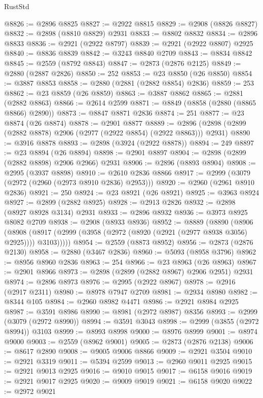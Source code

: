 \begin{lexlean}{RustStd}
\begin{coremodule}
@8826 := @2896 @8825
@8827 := @2922 @8815
@8829 := @2908 (@8826 @8827)
@8832 := @2898 (@8810 @8829) @2931
@8833 := @8802 @8832
@8834 := @2896 @8833
@8836 := @2921 (@2922 @8797)
@8839 := @2921 (@2922 @8807) @2925
@8840 := @8836 @8839
@8842 := @3243 @8840 @2709
@8843 := @8834 @8842
@8845 := @2559 (@8792 @8843)
@8847 := @2873 (@2876 @2125)
@8849 := @2880 (@2887 @2826)
@8850 := 252
@8853 := @23 @8850 (@26 @8850)
@8854 := @3887 @8853
@8858 := @2880 (@2881 (@2882 @8854) @2836)
@8859 := 253
@8862 := @23 @8859 (@26 @8859)
@8863 := @3887 @8862
@8865 := @2881 (@2882 @8863)
@8866 := @2614 @2599
@8871 := @8849 (@8858 (@2880 (@8865 @8866) @2890))
@8873 := @8847 @8871 @2836
@8874 := 251
@8877 := @23 @8874 (@26 @8874)
@8878 := @2901 @8877
@8889 := @2896 (@2898 (@2899 (@2882 @8878) @2906 (@2977 (@2922 @8854) (@2922 @8863))) @2931)
@8890 := @3916 @8878
@8893 := @2898 (@3924 (@2922 @8878))
@8894 := 249
@8897 := @23 @8894 (@26 @8894)
@8898 := @2901 @8897
@8904 := @2898 (@2899 (@2882 @8898) @2906 @2966) @2931
@8906 := @2896 (@8893 @8904)
@8908 := @2995 (@3937 @8898)
@8910 := @2610 @2836 @8866
@8917 := @2999 (@3079 (@2972 (@2960 (@2973 @8910 @2836) @2953)))
@8920 := @2960 (@2961 @8910 @2836)
@8921 := 250
@8924 := @23 @8921 (@26 @8921)
@8925 := @3963 @8924
@8927 := @2899 (@2882 @8925)
@8928 := @2913 @2826
@8932 := @2898 (@8927 @8928 @3134) @2931
@8933 := @2896 @8932
@8936 := @3973 @8925 @8082 @2709
@8938 := @2908 (@8933 @8936)
@8952 := @8889
    (@8890
      (@8906
        (@8908 (@8917 (@2999 (@3958 (@2972 (@8920 (@2921 (@2977 @8938 @3056) @2925)))) @3103)))))
@8954 := @2559 (@8873 @8952)
@8956 := @2873 (@2876 @2130)
@8958 := @2880 (@3467 @2836)
@8960 := @5093 (@8958 @3796)
@8962 := @8956 @8960 @2836
@8963 := 254
@8966 := @23 @8963 (@26 @8963)
@8967 := @2901 @8966
@8973 := @2898 (@2899 (@2882 @8967) @2906 @2951) @2931
@8974 := @2896 @8973
@8976 := @2995 (@2922 @8967)
@8978 := @2916 (@2917 @2311)
@8980 := @8978 @7947 @2709
@8981 := @2934 @8980
@8982 := @8344 @105
@8984 := @2960 @8982 @4471
@8986 := @2921 @8984 @2925
@8987 := @3591 @8986
@8990 := @8981 (@2972 @8987) @8356
@8993 := @2999 (@3079 (@2972 @8990))
@8994 := @3591 @3043
@8998 := @2999 (@3855 (@2972 @8994)) @3103
@8999 := @8993 @8998
@9000 := @8976 @8999
@9001 := @8974 @9000
@9003 := @2559 (@8962 @9001)
@9005 := @2873 (@2876 @2138)
@9006 := @8617 @2890
@9008 := @9005 @9006 @8866
@9009 := @2921 @3504
@9010 := @2921 @3319
@9011 := @5394 @2599
@9013 := @2960 @9011 @2925
@9015 := @2921 @9013 @2925
@9016 := @9010 @9015
@9017 := @6158 @9016
@9019 := @2921 @9017 @2925
@9020 := @9009 @9019
@9021 := @6158 @9020
@9022 := @2972 @9021

\end{coremodule}
\end{lexlean}
